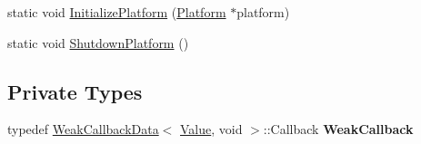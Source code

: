 \begin{DoxyCompactItemize}
\item 
static void \hyperlink{classv8_1_1_v8_a095eb8064458588a579c2b904e02dbbf}{Initialize\+Platform} (\hyperlink{classv8_1_1_platform}{Platform} $\ast$platform)
\item 
static void \hyperlink{classv8_1_1_v8_a228fad83cc2fe17f10cea1a6fb6669c7}{Shutdown\+Platform} ()
\end{DoxyCompactItemize}
\subsection*{Private Types}
\begin{DoxyCompactItemize}
\item 
typedef \hyperlink{classv8_1_1_weak_callback_data}{Weak\+Callback\+Data}$<$ \hyperlink{classv8_1_1_value}{Value}, void $>$\+::Callback {\bfseries Weak\+Callback}\hypertarget{classv8_1_1_v8_a050831c46e8ab0e9253f70169006919e}{}\label{classv8_1_1_v8_a050831c46e8ab0e9253f70169006919e}

\end{DoxyCompactItemize}

